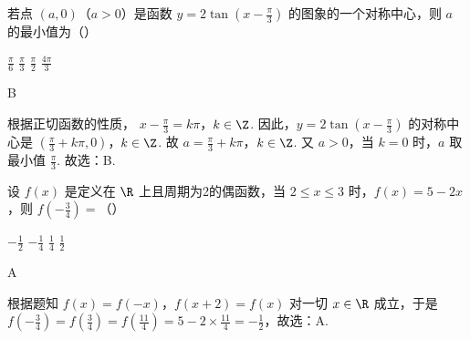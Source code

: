 \documentclass[UTF8,a4paper,oneside,11pt]{ctexbook}
\begin{document}
\begin{problem}
若点 \((a,0)\)（\(a>0\)）是函数 \(y=2\tan\left(x-\frac{\pi}{3}\right)\) 的图象的一个对称中心，则 \(a\) 的最小值为（\quad）

\choices
    {\(\frac{\pi}{6}\)}
    {\(\frac{\pi}{3}\)}
    {\(\frac{\pi}{2}\)}
    {\(\frac{4\pi}{3}\)}
\end{problem}

\begin{answer}
B
\end{answer}

\begin{solution}
根据正切函数的性质，
\(x-\frac{\pi}{3}=k\pi\)，\(k \in \Z\).
因此，\(y=2\tan\left(x-\frac{\pi}{3}\right)\) 的对称中心是 \(\left(\frac{\pi}{3}+k\pi,0\right)\)，\(k \in \Z\). 故 \(a=\frac{\pi}{3}+k\pi\)，\(k \in \Z\).
又 \(a>0\)，当 \(k=0\) 时，\(a\) 取最小值 \(\frac{\pi}{3}\). 故选：B.
\end{solution}

\begin{problem}
设 \(f(x)\) 是定义在 \(\R\) 上且周期为2的偶函数，当 \(2 \le x \le 3\) 时，\(f(x)=5-2x\)，则 \(f\left(-\frac{3}{4}\right)=\)（\quad）

\choices
    {\(-\frac{1}{2}\)}
    {\(-\frac{1}{4}\)}
    {\(\frac{1}{4}\)}
    {\(\frac{1}{2}\)}
\end{problem}

\begin{answer}
A
\end{answer}

\begin{solution}
根据题知 \(f(x)=f(-x)\)，\(f(x+2)=f(x)\) 对一切 \(x \in \R\) 成立，于是
\(f\left(-\frac{3}{4}\right)=f\left(\frac{3}{4}\right)=f\left(\frac{11}{4}\right)=5-2 \times \frac{11}{4}=-\frac{1}{2}\)，故选：A.
\end{solution}
\end{document}
